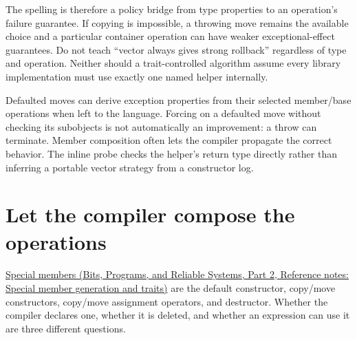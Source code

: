 The spelling is therefore a policy bridge from type properties to an operation's failure guarantee. If copying is impossible, a throwing move remains the available choice and a particular container operation can have weaker exceptional-effect guarantees. Do not teach ``vector always gives strong rollback'' regardless of type and operation. Neither should a trait-controlled algorithm assume every library implementation must use exactly one named helper internally.

Defaulted moves can derive exception properties from their selected member/base operations when left to the language. Forcing  on a defaulted move without checking its subobjects is not automatically an improvement: a throw can terminate. Member composition often lets the compiler propagate the correct behavior. The inline probe checks the helper's return type directly rather than inferring a portable vector strategy from a constructor log.

\section{Let the compiler compose the operations}\label{05-engine-i-ch003-let-the-compiler-compose-the-operations}

\hypertarget{05-engine-i-ch003-let-the-compiler-compose-the-operations}{}

\href{../01-Bits-Programs-and-Reliable-Systems-P02/main.pdf\#appendix-42e02a12c694}{Special members (Bits, Programs, and Reliable Systems, Part 2, Reference notes: Special member generation and traits)} are the default constructor, copy/move constructors, copy/move assignment operators, and destructor. Whether the compiler declares one, whether it is deleted, and whether an expression can use it are three different questions.

